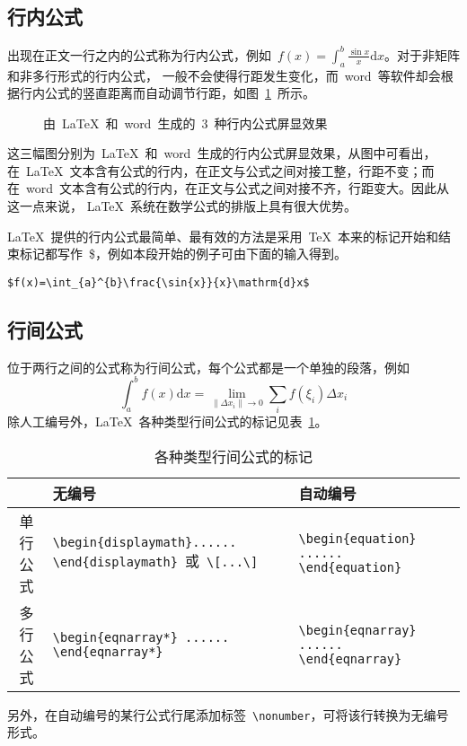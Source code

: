 \subsection{行内公式}
出现在正文一行之内的公式称为行内公式，例如~$f(x)=\int_{a}^{b}\frac{\sin{x}}{x}\mathrm{d}x$。对于非矩阵和非多行形式的行内公式，
一般不会使得行距发生变化，而~word~等软件却会根据行内公式的竖直距离而自动调节行距，如图~\ref{hangju}~所示。

\begin{figure}[htbp]
\centering
{}
\caption{由~\LaTeX~和~word~生成的~3~种行内公式屏显效果}\label{hangju}
\vspace{-1em}
\end{figure}
这三幅图分别为~\LaTeX~和~word~生成的行内公式屏显效果，从图中可看出，在~\LaTeX~文本含有公式的行内，在正文与公式之间对接工整，行距不变；而在~word~文本含有公式的行内，在正文与公式之间对接不齐，行距变大。因此从这一点来说，
\LaTeX~系统在数学公式的排版上具有很大优势。

\LaTeX~提供的行内公式最简单、最有效的方法是采用~\TeX~本来的标记\pozhehao 开始和结束标记都写作~\$，例如本段开始的例子可由下面的输入得到。

\verb|$f(x)=\int_{a}^{b}\frac{\sin{x}}{x}\mathrm{d}x$|

\subsection{行间公式}
位于两行之间的公式称为行间公式，每个公式都是一个单独的段落，例如
\[\int_a^b{f\left(x\right)\mathrm{d}x}=\lim_{\left\|\Delta{x_i}\right\|\to 0}\sum_i{f\left(\xi_i\right)\Delta{x_i}}\]
除人工编号外，\LaTeX~各种类型行间公式的标记见表~\ref{eqtag}。
\begin{table}[htbp]
\caption{各种类型行间公式的标记}\label{eqtag}
\vspace{-0.5em}\centering{}
\begin{tabularx}{0.85\textwidth}{cXX}
\toprule
& 无编号 & 自动编号\\\midrule
单行公式 & \verb|\begin{displaymath}...... \end{displaymath}|~或~\verb|\[...\]| & \verb|\begin{equation} ...... \end{equation}|\\
多行公式 & \verb|\begin{eqnarray*} ...... \end{eqnarray*}| & \verb|\begin{eqnarray} ...... \end{eqnarray}|\\
\bottomrule
\end{tabularx}
\end{table}
另外，在自动编号的某行公式行尾添加标签~\verb|\nonumber|，可将该行转换为无编号形式。

